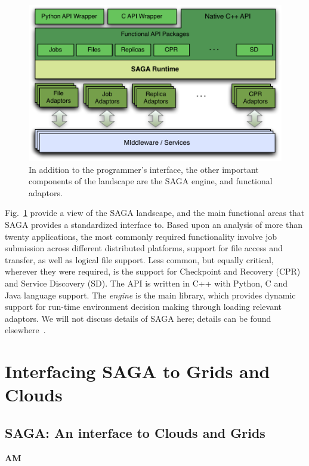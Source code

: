 \documentclass[conference,final]{IEEEtran}
\begin{document}
\begin{figure}[t]
\vspace{-2em}
\includegraphics[scale=0.5]{saga-figure02.pdf}
\caption{In addition to the programmer's interface,
  the other important components of the landscape are the SAGA engine,
  and functional adaptors.} \vspace{-2em}
\label{saga_figure}
\end{figure}

Fig.~\ref{saga_figure} provide a view of the SAGA landscape, and the
main functional areas that SAGA provides a standardized interface
to. Based upon an analysis of more than twenty applications, the most
commonly required functionality involve job submission across
different distributed platforms, support for file access and transfer,
as well as logical file support. Less common, but equally critical,
wherever they were required, is the support for Checkpoint and
Recovery (CPR) and Service Discovery (SD).  The API is written in C++
with Python, C and Java language support. The {\it engine} is the main
library, which provides dynamic support for run-time environment
decision making through loading relevant adaptors. We will not discuss
details of SAGA here; details can be found elsewhere~\cite{saga_url}.

\section{Interfacing SAGA to Grids and Clouds}

\subsection{SAGA: An interface to Clouds and Grids}{\bf AM}
\end{document}
